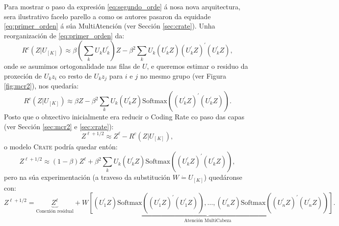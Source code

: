 Para mostrar o paso da expresión \ref{eq:segundo_orde} á nosa nova arquitectura, sera ilustrativo facelo parello a como os autores pasaron da equidade \ref{eq:primer_orden} á súa MultiAtención (ver Sección \ref{sec:crate}). Unha reorganización de \ref{eq:primer_orden} da:
\[R^c (Z | U_{[K]}) \approx \beta (\sum_kU_k U_k^{'})Z-\beta^{2} \sum_k U_k (U_k^{'}Z)(U_k^{'} Z)^{'}(U_k^{'} Z), \tag{3.a}\]
onde se asumimos ortogonalidade nas filas de $U$, e queremos estimar o residuo da proxeción de $U_k z_i$ co resto de $U_k z_j$ para $i$ e $j$ no mesmo grupo (ver Figura \ref{fig:mcr2}), nos quedaría:
\[R^c (Z | U_{[K]}) \approx \beta Z-\beta^{2} \sum_k U_k (U_k^{'}Z)\text{Softmax}((U_k^{'} Z)^{'}(U_k^{'} Z)).\tag{4.a}\]
Posto que o obxectivo inicialmente era reducir o Coding Rate co paso das capas (ver Sección \ref{sec:mcr2} e \ref{sec:crate}):
\[Z^{\ell+1/2} \approx Z^\ell - R^c (Z | U_{[K]}),\]
o modelo \textsc{Crate} podría quedar entón:
\[Z^{\ell+1/2} \approx (1-\beta)Z^\ell + \beta^{2} \sum_k U_k (U_k^{'}Z)\text{Softmax}((U_k^{'} Z)^{'}(U_k^{'} Z)), \tag{5.a}\]
pero na súa experimentación (a traveso da substitución $W \dot{=} U_{[K]}$) quedáronse con:
\[Z^{\ell+1/2} = \underbrace{Z^\ell}_{\text{Conexión residual}} +  \underbrace{W[(U_1^{'}Z)\text{Softmax}((U_1^{'} Z)^{'}(U_1^{'} Z)), \dots ,(U_n^{'}Z)\text{Softmax}((U_n^{'} Z)^{'}(U_n^{'} Z))]}_{\text{Atención MultiCabeza}}.\tag{6.a} \label{eq:multicabezaprimer}\]

